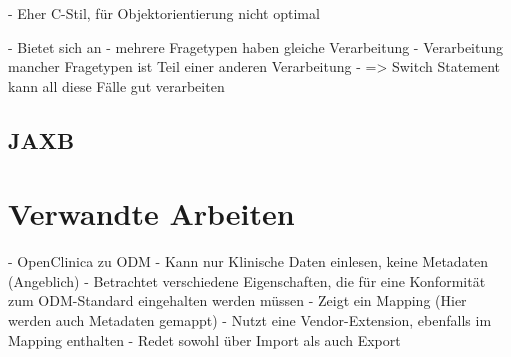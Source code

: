 - Eher C-Stil, für Objektorientierung nicht optimal

- Bietet sich an
	- mehrere Fragetypen haben gleiche Verarbeitung
	- Verarbeitung mancher Fragetypen ist Teil einer anderen Verarbeitung
- => Switch Statement kann all diese Fälle gut verarbeiten

\subsection{JAXB}

\section{Verwandte Arbeiten}

- OpenClinica zu ODM
	- Kann nur Klinische Daten einlesen, keine Metadaten (Angeblich)
	- Betrachtet verschiedene Eigenschaften, die für eine Konformität zum ODM-Standard eingehalten werden müssen
	- Zeigt ein Mapping (Hier werden auch Metadaten gemappt)
	- Nutzt eine Vendor-Extension, ebenfalls im Mapping enthalten
	- Redet sowohl über Import als auch Export
